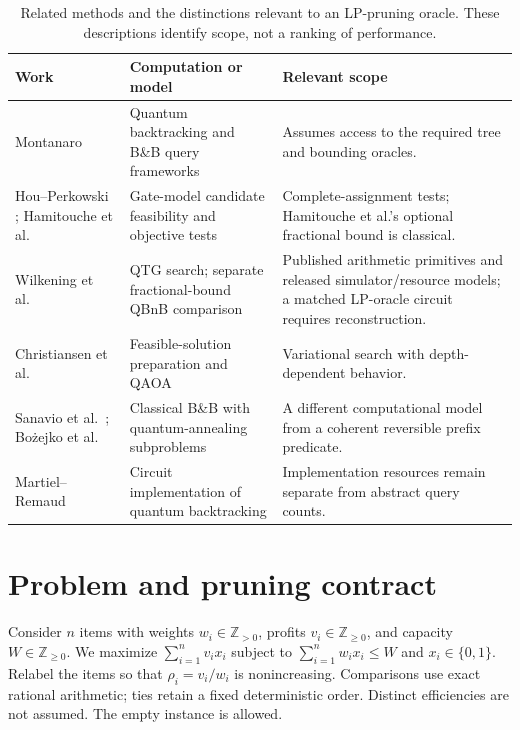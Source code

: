 \documentclass[referee,pdflatex,sn-mathphys-num]{sn-jnl}
\theoremstyle{thmstyleone}
\theoremstyle{thmstyletwo}
\begin{document}
\begin{table}[t]
\caption{Related methods and the distinctions relevant to an LP-pruning oracle. These descriptions identify scope, not a ranking of performance.}
\label{tab:related}
\centering
\small
\setlength{\tabcolsep}{5pt}
\begin{tabular}{>{\raggedright\arraybackslash}p{}>{\raggedright\arraybackslash}p{}>{\raggedright\arraybackslash}p{}}
\toprule
\textbf{Work} & \textbf{Computation or model} & \textbf{Relevant scope} \\
\midrule
Montanaro \cite{ref35,ref24} & Quantum backtracking and B\&B query frameworks & Assumes access to the required tree and bounding oracles. \\
Hou--Perkowski \cite{hou2020}; Hamitouche et al.\ \cite{hamitouche2025} & Gate-model candidate feasibility and objective tests & Complete-assignment tests; Hamitouche et al.'s optional fractional bound is classical. \\
Wilkening et al.\ \cite{wilkening2025,wilkening2025code} & QTG search; separate fractional-bound QBnB comparison & Published arithmetic primitives and released simulator/resource models; a matched LP-oracle circuit requires reconstruction. \\
Christiansen et al.\ \cite{ref23} & Feasible-solution preparation and QAOA & Variational search with depth-dependent behavior. \\
Sanavio et al.\ \cite{ref36}; Bo\.{z}ejko et al.\ \cite{bozejko2026} & Classical B\&B with quantum-annealing subproblems & A different computational model from a coherent reversible prefix predicate. \\
Martiel--Remaud \cite{martiel2019} & Circuit implementation of quantum backtracking & Implementation resources remain separate from abstract query counts. \\
\bottomrule
\end{tabular}
\end{table}



\section{Problem and pruning contract}\label{sec:model}
Consider $n$ items with weights $w_i\in\mathbb Z_{>0}$, profits $v_i\in\mathbb Z_{\geq0}$, and capacity $W\in\mathbb Z_{\geq0}$. We maximize $\sum_{i=1}^{n} v_i x_i$ subject to $\sum_{i=1}^{n} w_i x_i\leq W$ and $x_i\in\{0,1\}$. Relabel the items so that $\rho_i=v_i/w_i$ is nonincreasing. Comparisons use exact rational arithmetic; ties retain a fixed deterministic order. Distinct efficiencies are not assumed. The empty instance is allowed.
\end{document}
